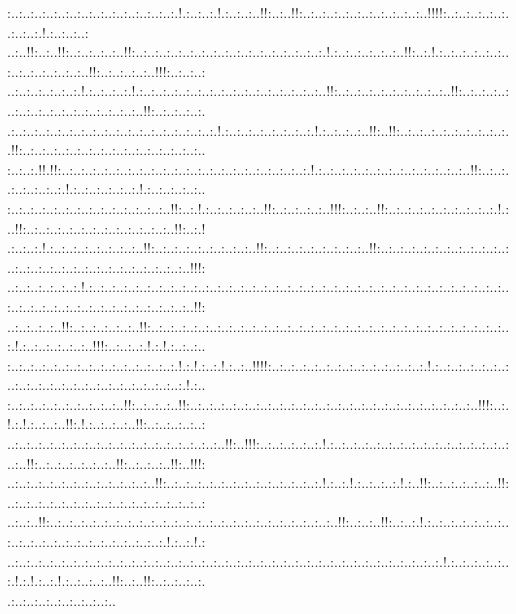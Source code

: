 \documentclass[paper=a4, fontsize=11pt]{scrartcl} %
\numberwithin{equation}{section} %
\numberwithin{figure}{section} %
\numberwithin{table}{section} %
\begin{document}
:..:..:..:..:..:..:..:..:..:..:..:..:..:..:.!.:..:..:.!.:..:..:..!!:..:..!!:..:..:..:..:..:..:..:..:..:..:..!!!!:..:..:..:..:..:..:..:..:.!.:..:..:..:\\..:..!!:..:..!!:..:..:..:..:..!!:..:..:..:..:..:..:..:..:..:..:..:..:..:..:..:..:.!.:..:..:..:..:..:..!!:..:.!.:..:..:..:..:..:..:..:..:..:..:..:..:..!!:..:..:..:..:..!!!:..:..:..:\\..:..:..:..:..:..:.!.:..:..:..:.!.:..:..:..:..:..:..:..:..:..:..:..:..:..:..:..:..!!:..:..:..:..:..:..:..:..:..:..!!:..:..:..:..:..:..:..:..:..:..:..:..:..:..:..:..!!:..:..:..:..:.\\.:..:..:..:..:..:..:..:..:..:..:..:..:..:..:..:..:..:.!.:..:..:..:..:..:..:..:.!.:..:..:..:..!!:..!!:..:..:..:..:..:..:..:..:..:..!!:..:..:..:..:..:..:..:..:..:..:..:..:..:..:..:..\\:..:..:.!!.!!:..:..:..:..:..:..:..:..:..:..:..:..:..:..:..:..:..:..:..:..:..:.!.:..:..:..:..:..:..:..:..:..:..:..:..:..!!:..:..:..:..:..:..:..:.!.:..:..:..:..:..:.!.:..:..:..:..:..\\:..:..:..:..:..:..:..:..:..:..:..:..:..:..!!:..:.!.:..:..:..:..:..!!:..:..:..:..:..!!!:..:..:..!!:..:..:..:..:..:..:..:..:..:.!.:..!!:..:..:..:..:..:..:..:..:..:..:..:..:..!!:..:.!\\.:..:..:.!.:..:..:..:..:..:..:..:..!!:..:..:..:..:..:..:..:..:..!!:..:..:..:..:..:..:..:..:..!!:..:..:..:..:..:..:..:..:..:..:..:..:..:..:..:..:..:..:..:..:..:..:..:..:..:..:..!!!:\\..:..:..:..:..:..:.!.:..:..:..:..:..:..:..:..:..:..:..:..:..:..:..:..:..:..:..:..:..:..:..:..:..:..:..:..:..:..:..:..:..:..:..:..:..:..:..:..:..:..:..:..:..:..:..:..:..:..:..:..!!:\\..:..:..:..:..!!:..:..:..:..:..:..!!:..:..:..:..:..:..:..:..:..:..:..:..:..:..:..:..:..:..:..:..:..:..:..:..:..:..:..:..:..:..:..:.!.:..:..:..:..:..:..!!!:..:..:..:.!.:.!.:..:..:..\\:..:..:..:..:..:..:..:..:..:..:..:..:..:..:.!.:.!.:..:.!.:..:..!!!!:..:..:..:..:..:..:..:..:..:..:..:..:..:.!.:..:..:..:..:..:..:..:..:..:..:..:..:..:..:..:..:..:..:..:..:..:.!.:..\\:..:..:..:..:..:..:..:..:..:..!!:..:..:..:..!!:..:..:..:..:..:..:..:..:..:..:..:..:..:..:..:..:..:..:..:..:..:..:..:..:..!!!:..:.!.:.!.:..:..:..!!:.!.:..:..:..:..!!:..:..:..:..:..:\\..:..:..:..:..:..:..:..:..:..:..:..:..:..:..:..:..:..:..!!:..!!!:..:..:..:..:..:.!.:..:..:..:..:..:..:..:..:..:..:..:..:..:..:..:..:..!!:..:..:..:..:..:..:..!!:..:..:..:..!!:..!!!:\\..:..:..:..:..:..:..:..:..:..:..:..:..!!:..:..:..:..:..:..:..:..:..:..:..:..:..:.!.:..:.!.:..:..:..:.!.:..!!:..:..:..:..:..:..!!:..:..:..:..:..:..:..:..:..:..:..:..:..:..:..:..:..:\\..:..:..!!:..:..:..:..:..:..:..:..:..:..:..:..:..:..:..:..:..:..:..:..:..:..:..:..:..!!:..:..:..!!:..:..:.!.:..:..:..:..:..:..:..:..:..:..:..:..:..:..:..:..:..:..:..:..:.!.:..:.!.:\\..:..:..:..:..:..:..:..:..:..:..:..:..:..:..:..:..:..:..:..:..:..:..:..:..:..:..:..:..:..:..:..:..:..:..:..:..:.!.:..:..:..:..:..:.!.:.!.:..:.!.:..:..:..:..!!:..:..!!:..:..:..:..:.\\.:..:..:..:..:..:..:..:..:..
\end{document}
